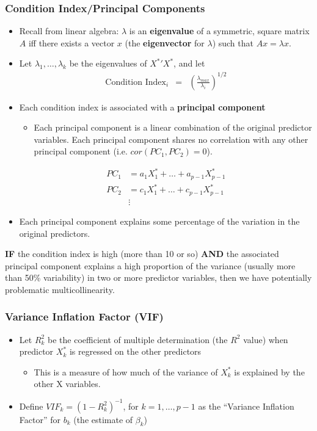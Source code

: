\documentclass[12pt]{../notes}
\begin{document}
\subsubsection{Condition Index/Principal Components}
\begin{itemize}
  \item Recall from linear algebra:  $\lambda$ is an {\bf eigenvalue} of a
symmetric, square matrix ${A}$ iff there exists a vector ${x}$ (the
{\bf eigenvector} for $\lambda$)
such that ${A} {x} = \lambda {x}$.
  \item Let $\lambda_1, \ldots, \lambda_k$ be the eigenvalues of ${X^*}'
{X^*}$, and let
\begin{eqnarray}
  \text{Condition Index}_i & = & \left( \frac{\lambda_{max}}{\lambda_i} \right)^{1/2} \nonumber
\end{eqnarray}
\item Each condition index is associated with a \textbf{principal component}
\begin{itemize}
\item Each principal component is a linear combination of the original predictor variables. Each principal component shares no correlation with any other principal component (i.e. $ cor({PC_1}, {PC_2}) =  0$).
\end{itemize}
\begin{align*}
 {PC_1} & =  a_1 {X^*_1} + \ldots + a_{p-1} {X^*_{p-1}} \\
 {PC_2} & =  c_1 {X^*_1} + \ldots + c_{p-1} {X^*_{p-1}}  \\
 &\vdots
\end{align*}
\item Each principal component explains some percentage of the variation in the original predictors. 
\end{itemize}

\begin{center}
\textbf{IF} the condition index is high (more than 10 or so) \textbf{AND} the associated principal component explains a high proportion of the variance (usually more than 50\% variability) in two or more predictor variables, then we have potentially problematic multicollinearity. 
\end{center}

\subsubsection{Variance Inflation Factor (VIF)}
\begin{itemize}
  \item Let $R_k^2$ be the coefficient of multiple determination (the $R^2$ value) when predictor $X^*_k$ is regressed on the other predictors
  \begin{itemize}
  \item This is a measure of how much of the variance of $X^*_k$ is explained by the other X variables. 
  \end{itemize}
   \item Define $VIF_k = (1-R_k^2)^{-1}$, for $k=1,\ldots,p-1$ as the ``Variance Inflation Factor'' for $b_k$ (the estimate of $\beta_k$)
\end{itemize}
\end{document}
